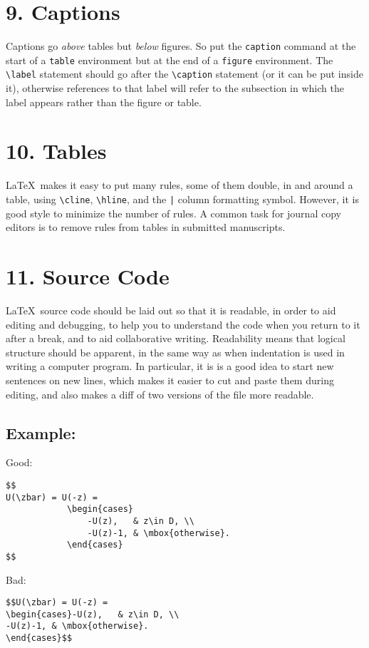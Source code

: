 \documentclass[12pt]{extarticle}
\begin{document}
\section*{9. Captions}
\label{sec-10}
Captions go \emph{above} tables but \emph{below} figures.
So put the \texttt{caption} command at the start of a \texttt{table} environment but at
the end of a \texttt{figure} environment.
The \texttt{\textbackslash{}label} statement should go after the \texttt{\textbackslash{}caption} statement
(or it can be put inside it), otherwise references to that label will refer
to the subsection in which the label appears rather than the figure or table.

\section*{10. Tables}
\label{sec-11}
\LaTeX\ makes it easy to put many rules, some of them double, 
in and around a table,
using 
\texttt{\textbackslash{}cline}, \texttt{\textbackslash{}hline}, and the \texttt{|} column formatting symbol.
However, it is good style to minimize the number of rules.
A common task for journal copy editors is to remove rules from tables in 
submitted manuscripts.

\section*{11. Source Code}
\label{sec-12}
\LaTeX\ source code should be laid out so that it is readable, in order to
aid editing and debugging, to help you to understand the code when you return
to it after a break, and to aid collaborative writing.
Readability means that logical structure should be apparent,
in the same way as when indentation is used in writing a computer program.
In particular, it is is a good idea 
to start new sentences on new lines, which makes it easier to cut
and paste them during editing,
and also makes a diff of two versions of the file more readable.

\subsection*{Example:}
\label{sec-12-1}

Good:
\begin{verbatim}
$$
U(\zbar) = U(-z) = 
            \begin{cases}
                -U(z),   & z\in D, \\ 
                -U(z)-1, & \mbox{otherwise}.
            \end{cases}
$$
\end{verbatim}
Bad:
\begin{verbatim}
$$U(\zbar) = U(-z) = 
\begin{cases}-U(z),   & z\in D, \\ 
-U(z)-1, & \mbox{otherwise}.
\end{cases}$$
\end{verbatim}
\end{document}
